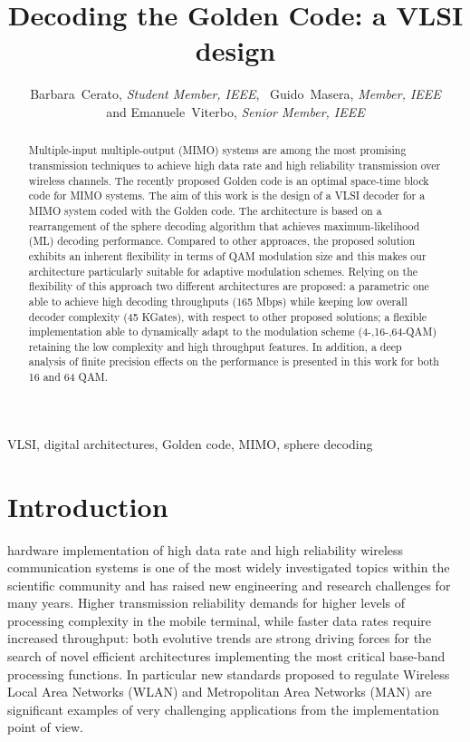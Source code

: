 \documentclass[12pt,onecolumn,draftclsnofoot]{IEEEtran}
\begin{document}
\title{Decoding the Golden Code: a VLSI design}
\author{Barbara~Cerato, {\em Student Member, IEEE},~ Guido~Masera, {\em Member,
IEEE}\\ and Emanuele~Viterbo, {\em Senior Member, IEEE}}






\maketitle


\begin{abstract}
Multiple-input multiple-output (MIMO) systems are among the most
promising transmission techniques to achieve high data rate and high
reliability transmission over wireless channels. The recently
proposed Golden code is an optimal space-time block code for 
MIMO systems. The aim of this work is the design of a VLSI decoder for
a MIMO system coded with the Golden code. The architecture is based
on a rearrangement of the sphere decoding algorithm that achieves
maximum-likelihood (ML) decoding performance. Compared to other approaces,
the proposed  solution exhibits an inherent flexibility in terms of
QAM modulation size and this makes our architecture 
particularly suitable for adaptive modulation schemes.
Relying on the flexibility of this
approach two different architectures are proposed: a
parametric one able to achieve high decoding throughputs
(165 Mbps) while keeping low overall decoder complexity (45 KGates),
 with respect to other proposed solutions; a flexible
implementation able to dynamically adapt to the modulation scheme
(4-,16-,64-QAM) retaining the low complexity and high throughput
features. In addition, a deep analysis of finite precision effects
on the performance is presented in this work for both 16 and 64 QAM.

\end{abstract}

\begin{keywords}
VLSI, digital architectures, Golden code, MIMO, sphere decoding
\end{keywords}


\IEEEpeerreviewmaketitle



\section{Introduction}
 hardware implementation of high data rate and high
reliability wireless communication systems is one of the most
widely investigated topics within the scientific community and has
raised new engineering and research challenges for many years.
Higher transmission reliability demands for higher levels of
processing complexity in the mobile terminal, while faster data
rates require increased throughput: both evolutive trends are
strong driving forces for the search of novel efficient
architectures implementing the most critical base-band processing
functions. In particular new standards proposed to regulate Wireless
Local Area Networks (WLAN) and Metropolitan Area Networks (MAN) are
significant examples of very challenging applications from the
implementation point of view.
\end{document}
